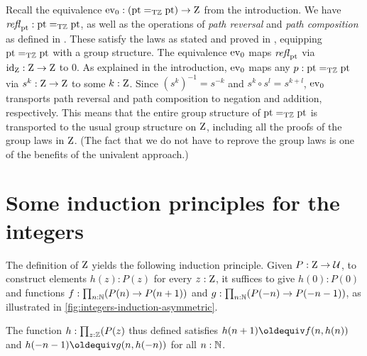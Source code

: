 \documentclass[a4,12pt]{amsart}
\begin{document}

Recall the equivalence $\mathrm{ev}_0 : ({\mathord{\mathrm{pt}}}=_{\mathrm{T}\mathbb{Z}} {\mathord{\mathrm{pt}}})\to\mathrm{Z}$ from the introduction.
We have $\mathop{{\it refl}_{{\mathord{\mathrm{pt}}}}} : {\mathord{\mathrm{pt}}}=_{\mathrm{T}\mathbb{Z}} {\mathord{\mathrm{pt}}}$, as well as the operations
of \emph{path reversal} and \emph{path composition} as defined
in \cite[Ch. 2.1]{hottbook}. These satisfy the laws as stated
and proved in \cite[Lemma 2.1.4]{hottbook}, equipping ${\mathord{\mathrm{pt}}}=_{\mathrm{T}\mathbb{Z}} {\mathord{\mathrm{pt}}}$
with a group structure.
The equivalence $\mathrm{ev}_0$ maps $\mathop{{\it refl}_{{\mathord{\mathrm{pt}}}}}$ via $\mathord{\mathrm{id}}_{\mathrm{Z}} : \mathrm{Z}\to\mathrm{Z}$ to $0$.
As explained in the introduction, $\mathrm{ev}_0$ maps any $p : {\mathord{\mathrm{pt}}}=_{\mathrm{T}\mathbb{Z}} {\mathord{\mathrm{pt}}}$
via $s^k : \mathrm{Z}\to\mathrm{Z}$ to some $k:\mathrm{Z}$. Since $(s^k)^{-1} = s^{-k}$
and $s^k \circ s^l = s^{k+l}$, $\mathrm{ev}_0$ transports path reversal 
and path composition to negation and addition, respectively.
This means that the entire group structure of ${\mathord{\mathrm{pt}}}=_{\mathrm{T}\mathbb{Z}} {\mathord{\mathrm{pt}}}$
is transported to the usual group structure on $\mathrm{Z}$,
including all the proofs of the group laws in $\mathrm{Z}$.
(The fact that we do not have to reprove the group laws
is one of the benefits of the univalent approach.)


\section{Some induction principles for the integers}
\label{sec:integers-induction}

The definition of $\mathrm{Z}$ yields the following induction principle.
Given $P : \mathrm{Z} \to \mathcal{U}$, to construct elements $h(z) : P(z)$ for every $z : \mathrm{Z}$,
it suffices to give $h(0): P(0)$ and functions
$f : \prod_{n:\mathbb{N}}(P(n) \to P(n+1))$ and
$g : \prod_{n:\mathbb{N}}(P(-n) \to P(-n-1))$, 
as illustrated in \cref{fig:integers-induction-asymmetric}.

The function $h:\prod_{z:\mathbb{Z}}(P(z)$ thus defined satisfies
$h(n+1)\jdeq f(n,h(n))$ and $h(-n-1)\jdeq g(n,h(-n))$ for all $n:\mathbb{N}$.
\end{document}
